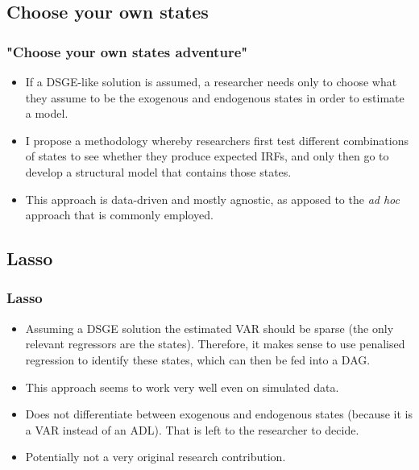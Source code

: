 \documentclass{beamer}
\begin{document}
\subsection{Choose your own states}
\begin{frame}
    \frametitle{"Choose your own states adventure"}
    \begin{itemize}
        \item If a DSGE-like solution is assumed, a researcher needs only to choose what they assume to be the exogenous and endogenous states in order to estimate a model.
        \item I propose a methodology whereby researchers first test different combinations of states to see whether they produce expected IRFs, and only then go to develop a structural model that contains those states.
        \item This approach is data-driven and mostly agnostic, as apposed to the \textit{ad hoc} approach that is commonly employed.
    \end{itemize}
\end{frame}

\subsection{Lasso}
\begin{frame}
    \frametitle{Lasso}
    \begin{itemize}
        \item Assuming a DSGE solution the estimated VAR should be sparse (the only relevant regressors are the states). Therefore, it makes sense to use penalised regression to identify these states, which can then be fed into a DAG.
        \item This approach seems to work very well even on simulated data.
        \item Does not differentiate between exogenous and endogenous states (because it is a VAR instead of an ADL). That is left to the researcher to decide.
        \item Potentially not a very original research contribution.
    \end{itemize}
\end{frame}
\end{document}
